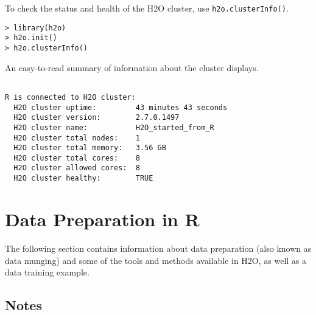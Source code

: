 {{To check the status and health of the H2O cluster, use {\texttt{h2o.clusterInfo()}}.
\begin{lstlisting}[style=R]
> library(h2o)
> h2o.init()
> h2o.clusterInfo()
\end{lstlisting}

\begin{minipage}{\textwidth}

An easy-to-read summary of information about the cluster displays. 

\begin{lstlisting}[style=R]

R is connected to H2O cluster:
  H2O cluster uptime:         43 minutes 43 seconds
  H2O cluster version:        2.7.0.1497
  H2O cluster name:           H2O_started_from_R
  H2O cluster total nodes:    1
  H2O cluster total memory:   3.56 GB
  H2O cluster total cores:    8
  H2O cluster allowed cores:  8
  H2O cluster healthy:        TRUE

\end{lstlisting}

\end{minipage}

\section{Data Preparation in R}

The following section contains information about data preparation (also known as data munging) and some of the tools and methods available in H2O, as well as a data training example. 

\subsection{Notes}
\begin{itemize}


\end{itemize}}}
